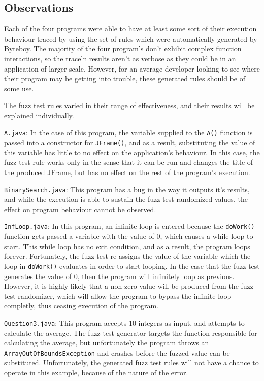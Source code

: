 \documentclass[letterpaper,twocolumn,10pt]{article}
\begin{document}
\subsection{Observations}

Each of the four programs were able to have at least some sort of their execution behaviour traced by using the set of rules which were automatically generated by Byteboy. The majority of the four program's don't exhibit complex function interactions, so the traceln results aren't as verbose as they could be in an application of larger scale. However, for an average developer looking to see where their program may be getting into trouble, these generated rules should be of some use.

The fuzz test rules varied in their range of effectiveness, and their results will be explained individually.

{\tt A.java}: In the case of this program, the variable supplied to the {\tt A()} function is passed into a constructor for {\tt JFrame()}, and as a result, substituting the value of this variable has little to no effect on the application's behaviour. In this case, the fuzz test rule works only in the sense that it can be run and changes the title of the produced JFrame, but has no effect on the rest of the program's execution.

{\tt BinarySearch.java}: This program has a bug in the way it outputs it's results, and while the execution is able to sustain the fuzz test randomized values, the effect on program behaviour cannot be observed.

{\tt InfLoop.java}: In this program, an infinite loop is entered because the {\tt doWork()} function gets passed a variable with the value of 0, which causes a while loop to start. This while loop has no exit condition, and as a result, the program loops forever. Fortunately, the fuzz test re-assigns the value of the variable which the loop in {\tt doWork()} evaluates in order to start looping. In the case that the fuzz test generates the value of 0, then the program will infinitely loop as previous. However, it is highly likely that a non-zero value will be produced from the fuzz test randomizer, which will allow the program to bypass the infinite loop completly, thus ceasing execution of the program.

{\tt Question3.java}: This program accepts 10 integers as input, and attempts to calculate the average. The fuzz test generator targets the function responsible for calculating the average, but unfortunately the program throws an {\tt ArrayOutOfBoundsException} and crashes before the fuzzed value can be substituted. Unfortunately, the generated fuzz test rules will not have a chance to operate in this example, because of the nature of the error.
\end{document}
